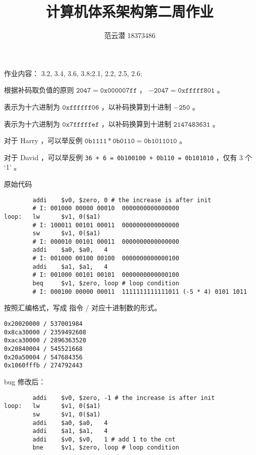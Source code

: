 \documentclass[lang=cn,11pt,a4paper,cite=authoryear]{elegantpaper}
\title{计算机体系架构\quad 第二周作业}
\author{范云潜 18373486}
\institute{微电子学院 184111 班}
\date{\zhtoday}
\begin{document}
\maketitle

作业内容： 3.2, 3.4, 3.6, 3.8;2.1, 2.2, 2.5, 2.6;




根据补码取负值的原则 \(\mathtt{2047} = \mathtt{0x000007ff}\) ，
\(\mathtt{-2047} = \mathtt{0xfffff801}\) 。


表示为十六进制为 \(\mathtt{0xffffff06}\) ，以补码换算到十进制 \(\mathtt{-250}\) 。


表示为十六进制为 \(\mathtt{0x7fffffef}\) ，以补码换算到十进制 \(\mathtt{2147483631}\) 。


对于 Harry ，可以举反例 \(\mathtt{0b1111 * 0b0110} = \mathtt{0b1011010}\) 。

对于 David ，可以举反例 \lstinline{36 + 6 = 0b100100 + 0b110 = 0b101010} ，仅有 3 个 ‘1’ 。


原始代码

\begin{lstlisting}
        addi    $v0, $zero, 0 # the increase is after init
        # I: 001000 00000 00010  0000000000000000
loop:   lw      $v1, 0($a1)
        # I: 100011 00101 00011  0000000000000000
        sw      $v1, 0($a1)
        # I: 000010 00101 00011  0000000000000000
        addi    $a0, $a0,   4
        # I: 001000 00100 00100  0000000000000100
        addi    $a1, $a1,   4
        # I: 001000 00101 00101  0000000000000100
        beq     $v1, $zero, loop # loop condition
        # I: 000100 00000 00011  1111111111111011 (-5 * 4) 0101 1011
\end{lstlisting}

按照汇编格式，写成 指令 / 对应十进制数的形式。

\begin{lstlisting}
0x20020000 / 537001984
0x8ca30000 / 2359492608
0xaca30000 / 2896363520
0x20840004 / 545521668
0x20a50004 / 547684356
0x1060fffb / 274792443
\end{lstlisting}    

bug 修改后：

\begin{lstlisting}
        addi    $v0, $zero, -1 # the increase is after init
loop:   lw      $v1, 0($a1)
        sw      $v1, 0($a1)
        addi    $a0, $a0,   4
        addi    $a1, $a1,   4
        addi    $v0, $v0,   1 # add 1 to the cnt 
        bne     $v1, $zero, loop # loop condition

\end{lstlisting}
\end{document}
